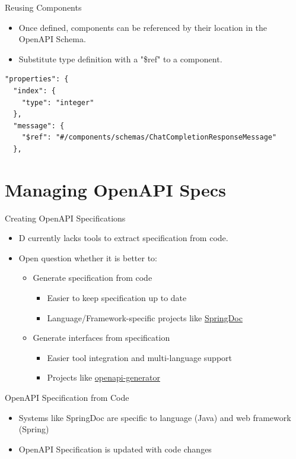 \documentclass[bigger]{beamer}
\begin{document}
\begin{frame}[label={sec:orgdc070d1},fragile]{Reusing Components}
 \begin{itemize}
\item Once defined, components can be referenced by their location in the OpenAPI Schema.
\item Substitute type definition with a "\$ref" to a component.
\end{itemize}

\begin{verbatim}
"properties": {
  "index": {
    "type": "integer"
  },
  "message": {
    "$ref": "#/components/schemas/ChatCompletionResponseMessage"
  },
\end{verbatim}
\end{frame}

\section{Managing OpenAPI Specs}
\label{sec:org9c81e22}

\begin{frame}[label={sec:org8fc2b23}]{Creating OpenAPI Specifications}
\begin{itemize}
\item D currently lacks tools to extract specification from code.
\item Open question whether it is better to:
\begin{itemize}
\item Generate specification from code
\begin{itemize}
\item Easier to keep specification up to date
\item Language/Framework-specific projects like \href{https://springdoc.org/}{SpringDoc}
\end{itemize}
\item Generate interfaces from specification
\begin{itemize}
\item Easier tool integration and multi-language support
\item Projects like \href{https://github.com/OpenAPITools/openapi-generator}{openapi-generator}
\end{itemize}
\end{itemize}
\end{itemize}
\end{frame}

\begin{frame}[label={sec:orge94403f}]{OpenAPI Specification from Code}
\begin{itemize}
\item Systems like SpringDoc are specific to language (Java) and web framework (Spring)
\item OpenAPI Specification is updated with code changes
\end{itemize}

\begin{center}

\end{center}
\end{frame}
\end{document}
